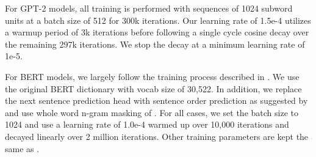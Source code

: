 
For GPT-2 models, all training is performed with sequences of 1024 subword units at a batch size of 512 for 300k iterations. Our learning rate of 1.5e-4 utilizes a warmup period of 3k iterations before following a single cycle cosine decay over the remaining 297k iterations. We stop the decay at a minimum learning rate of 1e-5.

For BERT models, we largely follow the training process described in \cite{ALBERT2019}. We use the original BERT dictionary with vocab size of 30,522. In addition, we replace the next sentence prediction head with sentence order prediction as suggested by \cite{ALBERT2019} and use whole word n-gram masking of \cite{SpanBERT2019}. For all cases, we set the batch size to 1024 and use a learning rate of 1.0e-4 warmed up over 10,000 iterations and decayed linearly over 2 million iterations. Other training parameters are kept the same as \cite{devlin2018bert}.



